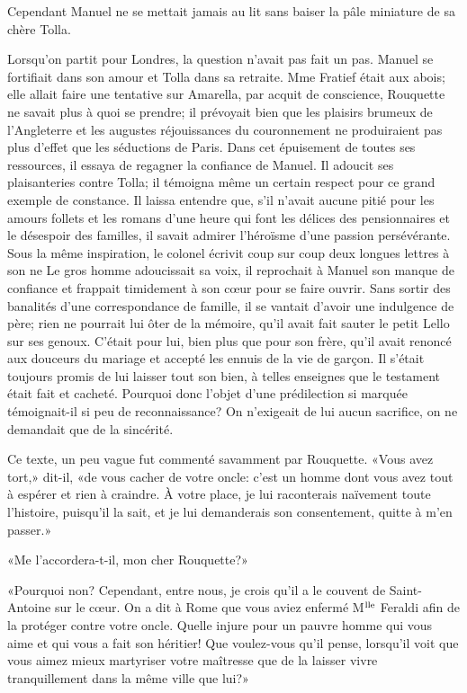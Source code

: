 Cependant Manuel ne se mettait jamais au lit sans baiser la pâle miniature de sa chère Tolla.

Lorsqu'on partit pour Londres, la question n'avait pas fait un pas. Manuel se fortifiait dans son amour et Tolla dans sa retraite. Mme Fratief était aux abois; elle allait faire une tentative sur Amarella, par acquit de conscience, Rouquette ne savait plus à quoi se prendre; il prévoyait bien que les plaisirs brumeux de l'Angleterre et les augustes réjouissances du couronnement ne produiraient pas plus d'effet que les séductions de Paris. Dans cet épuisement de toutes ses ressources, il essaya de regagner la confiance de Manuel. Il adoucit ses plaisanteries contre Tolla; il témoigna même un certain respect pour ce grand exemple de constance. Il laissa entendre que, s'il n'avait aucune pitié pour les amours follets et les romans d'une heure qui font les délices des pensionnaires et le désespoir des familles, il savait admirer l'héroïsme d'une passion persévérante. Sous la même inspiration, le colonel écrivit coup sur coup deux longues lettres à son ne Le gros homme adoucissait sa voix, il reprochait à Manuel son manque de confiance et frappait timidement à son c\oe{}ur pour se faire ouvrir. Sans sortir des banalités d'une correspondance de famille, il se vantait d'avoir une indulgence de père; rien ne pourrait lui ôter de la mémoire, qu'il avait fait sauter le petit Lello sur ses genoux. C'était pour lui, bien plus que pour son frère, qu'il avait renoncé aux douceurs du mariage et accepté les ennuis de la vie de garçon. Il s'était toujours promis de lui laisser tout son bien, à telles enseignes que le testament était fait et cacheté. Pourquoi donc l'objet d'une prédilection si marquée témoignait-il si peu de reconnaissance? On n'exigeait de lui aucun sacrifice, on ne demandait que de la sincérité.

Ce texte, un peu vague fut commenté savamment par Rouquette. «Vous avez tort,» dit-il, «de vous cacher de votre oncle: c'est un homme dont vous avez tout à espérer et rien à craindre. À votre place, je lui raconterais naïvement toute l'histoire, puisqu'il la sait, et je lui demanderais son consentement, quitte à m'en passer.»

«Me l'accordera-t-il, mon cher Rouquette?»

«Pourquoi non? Cependant, entre nous, je crois qu'il a le couvent de Saint-Antoine sur le c\oe{}ur. On a dit à Rome que vous aviez enfermé M$\textsuperscript{lle}$ Feraldi afin de la protéger contre votre oncle. Quelle injure pour un pauvre homme qui vous aime et qui vous a fait son héritier! Que voulez-vous qu'il pense, lorsqu'il voit que vous aimez mieux martyriser votre maîtresse que de la laisser vivre tranquillement dans la même ville que lui?»

